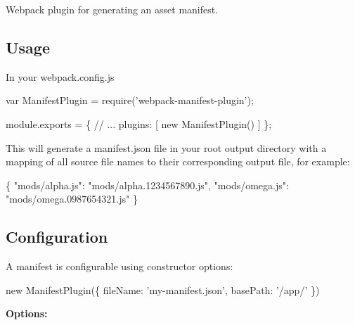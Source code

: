 Webpack plugin for generating an asset manifest.

\href{https://circleci.com/gh/danethurber/webpack-manifest-plugin}{\tt }

\subsection*{Usage}

In your {\ttfamily webpack.\+config.\+js}


\begin{DoxyCode}
var ManifestPlugin = require('webpack-manifest-plugin');

module.exports = \{
    // ...
    plugins: [
      new ManifestPlugin()
    ]
\};
\end{DoxyCode}


This will generate a {\ttfamily manifest.\+json} file in your root output directory with a mapping of all source file names to their corresponding output file, for example\+:


\begin{DoxyCode}
\{
  "mods/alpha.js": "mods/alpha.1234567890.js",
  "mods/omega.js": "mods/omega.0987654321.js"
\}
\end{DoxyCode}


\subsection*{Configuration}

A manifest is configurable using constructor options\+:


\begin{DoxyCode}
new ManifestPlugin(\{
  fileName: 'my-manifest.json',
  basePath: '/app/'
\})
\end{DoxyCode}


{\bfseries Options\+:}


